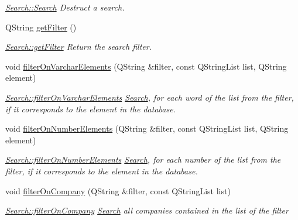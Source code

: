 \begin{DoxyCompactItemize}
\begin{DoxyCompactList}\small\item\em \hyperlink{classModels_1_1Search_a05ea0037161dce5dde6876afa384d71f}{Search\-::\-Search} Destruct a search. \end{DoxyCompactList}\item 
Q\-String \hyperlink{classModels_1_1Search_ab3ec88b48f6b404f8027dcbfce1495c6}{get\-Filter} ()
\begin{DoxyCompactList}\small\item\em \hyperlink{classModels_1_1Search_ab3ec88b48f6b404f8027dcbfce1495c6}{Search\-::get\-Filter} Return the search filter. \end{DoxyCompactList}\item 
void \hyperlink{classModels_1_1Search_a63afd22af898b54b405be45a8a1ff843}{filter\-On\-Varchar\-Elements} (Q\-String \&filter, const Q\-String\-List list, Q\-String element)
\begin{DoxyCompactList}\small\item\em \hyperlink{classModels_1_1Search_a63afd22af898b54b405be45a8a1ff843}{Search\-::filter\-On\-Varchar\-Elements} \hyperlink{classModels_1_1Search}{Search}, for each word of the {\itshape list} from the {\itshape filter}, if it corresponds to the {\itshape element} in the database. \end{DoxyCompactList}\item 
void \hyperlink{classModels_1_1Search_ab7c6fc3cf9062848c118ab7e8380726c}{filter\-On\-Number\-Elements} (Q\-String \&filter, const Q\-String\-List list, Q\-String element)
\begin{DoxyCompactList}\small\item\em \hyperlink{classModels_1_1Search_ab7c6fc3cf9062848c118ab7e8380726c}{Search\-::filter\-On\-Number\-Elements} \hyperlink{classModels_1_1Search}{Search}, for each number of the {\itshape list} from the {\itshape filter}, if it corresponds to the {\itshape element} in the database. \end{DoxyCompactList}\item 
void \hyperlink{classModels_1_1Search_af5e7f802c53a735915193fd596d45f07}{filter\-On\-Company} (Q\-String \&filter, const Q\-String\-List list)
\begin{DoxyCompactList}\small\item\em \hyperlink{classModels_1_1Search_af5e7f802c53a735915193fd596d45f07}{Search\-::filter\-On\-Company} \hyperlink{classModels_1_1Search}{Search} all companies contained in the {\itshape list} of the {\itshape filter} \end{DoxyCompactList}\item 

\end{DoxyCompactItemize}
